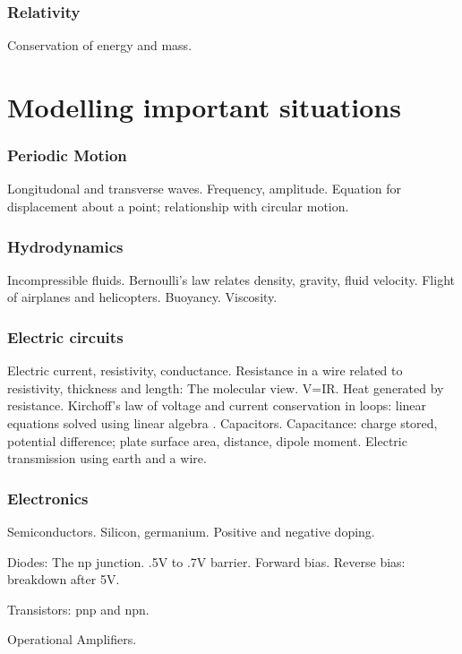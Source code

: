 \documentclass{article}
\begin{document}
\section{Relativity}
Conservation of energy and mass.

\part{Modelling important situations}
\section{Periodic Motion}
Longitudonal and transverse waves. Frequency, amplitude. Equation for displacement about a point; relationship with circular motion.

\section{Hydrodynamics}
Incompressible fluids. Bernoulli's law relates density, gravity, fluid velocity. Flight of airplanes and helicopters. Buoyancy. Viscosity.

\section{Electric circuits}
Electric current, resistivity, conductance. Resistance in a wire related to resistivity, thickness and length: The molecular view. V=IR. Heat generated by resistance. Kirchoff's law of voltage and current conservation in loops: linear equations solved using linear algebra \cite{strang}. Capacitors. Capacitance: charge stored, potential difference; plate surface area, distance, dipole moment. Electric transmission using earth and a wire.

\section{Electronics}
Semiconductors. Silicon, germanium. Positive and negative doping.

Diodes: The np junction. .5V to .7V barrier. Forward bias. Reverse bias: breakdown after 5V.

Transistors: pnp and npn.

Operational Amplifiers.



\end{document}
